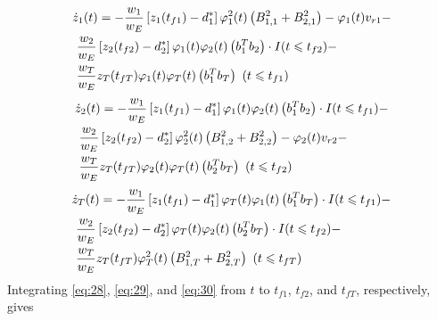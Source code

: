 \begin{equation}
\label{eq:28}
\begin{gathered}
  {{\dot z}_1}(t) =  - \frac{{{w_1}}}{{{w_E}}}\left[ {{z_1}({t_{f1}}) - d_1^*} \right]\varphi _1^2(t)\left( {B_{1,1}^2 + B_{2,1}^2} \right) - {\varphi _1}(t){v_{r1}} -  \hfill \\
  {\text{          }}\frac{{{w_2}}}{{{w_E}}}\left[ {{z_2}({t_{f2}}) - d_2^*} \right]{\varphi _1}(t){\varphi _2}(t)\left( {b_1^T{b_2}} \right) \cdot I(t \leqslant {t_{f2}}) - \quad  \hfill \\
  {\text{          }}\frac{{{w_T}}}{{{w_E}}}{z_T}({t_{fT}}){\varphi _1}(t){\varphi _T}(t)\left( {b_1^T{b_T}} \right){\text{   }}(t \leqslant {t_{f1}}) \hfill \\ 
\end{gathered}
\end{equation}
\begin{equation}
\label{eq:29}
\begin{gathered}
  {{\dot z}_2}(t) =  - \frac{{{w_1}}}{{{w_E}}}\left[ {{z_1}({t_{f1}}) - d_1^*} \right]{\varphi _1}(t){\varphi _2}(t)\left( {b_1^T{b_2}} \right) \cdot I(t \leqslant {t_{f1}}) -  \hfill \\
  {\text{          }}\frac{{{w_2}}}{{{w_E}}}\left[ {{z_2}({t_{f2}}) - d_2^*} \right]\varphi _2^2(t)\left( {B_{1,2}^2 + B_{2,2}^2} \right) - {\varphi _2}(t){v_{r2}} -  \hfill \\
  {\text{          }}\frac{{{w_T}}}{{{w_E}}}{z_T}({t_{fT}}){\varphi _2}(t){\varphi _T}(t)\left( {b_2^T{b_T}} \right){\text{   }}(t \leqslant {t_{f2}}) \hfill \\ 
\end{gathered}
\end{equation}
\begin{equation}
\label{eq:30}
\begin{gathered}
  {{\dot z}_T}(t) =  - \frac{{{w_1}}}{{{w_E}}}\left[ {{z_1}({t_{f1}}) - d_1^*} \right]{\varphi _T}(t){\varphi _1}(t)\left( {b_1^T{b_T}} \right) \cdot I(t \leqslant {t_{f1}}) -  \hfill \\
  {\text{          }}\frac{{{w_2}}}{{{w_E}}}\left[ {{z_2}({t_{f2}}) - d_2^*} \right]{\varphi _T}(t){\varphi _2}(t)\left( {b_2^T{b_T}} \right) \cdot I(t \leqslant {t_{f2}}) - \quad  \hfill \\
  {\text{          }}\frac{{{w_T}}}{{{w_E}}}{z_T}({t_{fT}})\varphi _T^2(t)\left( {B_{1,T}^2 + B_{2,T}^2} \right){\text{   }}(t \leqslant {t_{fT}}) \hfill \\ 
\end{gathered}
\end{equation}
Integrating \eqref{eq:28}, \eqref{eq:29}, and \eqref{eq:30} from $t$ to ${t_{f1}}$, ${t_{f2}}$, and ${t_{fT}}$, respectively, gives

